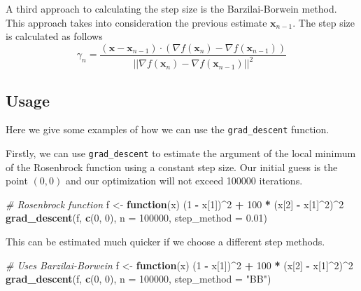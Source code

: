 \documentclass[12pt,]{article}
\newenvironment{Shaded}{\begin{snugshade}}{\end{snugshade}}
\newcommand{\CommentTok}[1]{\textcolor[rgb]{0.56,0.35,0.01}{\textit{#1}}}
\newcommand{\ControlFlowTok}[1]{\textcolor[rgb]{0.13,0.29,0.53}{\textbf{#1}}}
\newcommand{\DataTypeTok}[1]{\textcolor[rgb]{0.13,0.29,0.53}{#1}}
\newcommand{\DecValTok}[1]{\textcolor[rgb]{0.00,0.00,0.81}{#1}}
\newcommand{\FloatTok}[1]{\textcolor[rgb]{0.00,0.00,0.81}{#1}}
\newcommand{\KeywordTok}[1]{\textcolor[rgb]{0.13,0.29,0.53}{\textbf{#1}}}
\newcommand{\NormalTok}[1]{#1}
\newcommand{\OperatorTok}[1]{\textcolor[rgb]{0.81,0.36,0.00}{\textbf{#1}}}
\newcommand{\StringTok}[1]{\textcolor[rgb]{0.31,0.60,0.02}{#1}}
\begin{document}
A third approach to calculating the step size is the Barzilai-Borwein
method. This approach takes into consideration the previous estimate
\(\mathbf{x}_{n-1}\). The step size is calculated as follows \[
    \gamma_n = \frac{(\mathbf{x} - \mathbf{x}_{n-1}) \cdot (\nabla f(\mathbf{x}_n) - \nabla f(\mathbf{x}_{n-1}))}{||\nabla f(\mathbf{x}_n) - \nabla f(\mathbf{x}_{n-1})||^2}
\]

\hypertarget{usage}{%
\subsection{Usage}\label{usage}}

Here we give some examples of how we can use the \texttt{grad\_descent}
function.

Firstly, we can use \texttt{grad\_descent} to estimate the argument of
the local minimum of the Rosenbrock function using a constant step size.
Our initial guess is the point \((0,0)\) and our optimization will not
exceed 100000 iterations.

\begin{Shaded}
\begin{Highlighting}[]
    \CommentTok{# Rosenbrock function}
\NormalTok{    f <-}\StringTok{ }\ControlFlowTok{function}\NormalTok{(x) (}\DecValTok{1} \OperatorTok{-}\StringTok{ }\NormalTok{x[}\DecValTok{1}\NormalTok{])}\OperatorTok{^}\DecValTok{2} \OperatorTok{+}\StringTok{ }\DecValTok{100} \OperatorTok{*}\StringTok{ }\NormalTok{(x[}\DecValTok{2}\NormalTok{] }\OperatorTok{-}\StringTok{ }\NormalTok{x[}\DecValTok{1}\NormalTok{]}\OperatorTok{^}\DecValTok{2}\NormalTok{)}\OperatorTok{^}\DecValTok{2}
    \KeywordTok{grad_descent}\NormalTok{(f, }\KeywordTok{c}\NormalTok{(}\DecValTok{0}\NormalTok{, }\DecValTok{0}\NormalTok{), }\DataTypeTok{n =} \DecValTok{100000}\NormalTok{, }\DataTypeTok{step_method =} \FloatTok{0.01}\NormalTok{)}
\end{Highlighting}
\end{Shaded}

This can be estimated much quicker if we choose a different step
methods.

\begin{Shaded}
\begin{Highlighting}[]
    \CommentTok{# Uses Barzilai-Borwein}
\NormalTok{    f <-}\StringTok{ }\ControlFlowTok{function}\NormalTok{(x) (}\DecValTok{1} \OperatorTok{-}\StringTok{ }\NormalTok{x[}\DecValTok{1}\NormalTok{])}\OperatorTok{^}\DecValTok{2} \OperatorTok{+}\StringTok{ }\DecValTok{100} \OperatorTok{*}\StringTok{ }\NormalTok{(x[}\DecValTok{2}\NormalTok{] }\OperatorTok{-}\StringTok{ }\NormalTok{x[}\DecValTok{1}\NormalTok{]}\OperatorTok{^}\DecValTok{2}\NormalTok{)}\OperatorTok{^}\DecValTok{2}
    \KeywordTok{grad_descent}\NormalTok{(f, }\KeywordTok{c}\NormalTok{(}\DecValTok{0}\NormalTok{, }\DecValTok{0}\NormalTok{), }\DataTypeTok{n =} \DecValTok{100000}\NormalTok{, }\DataTypeTok{step_method =} \StringTok{"BB"}\NormalTok{)}
\end{Highlighting}
\end{Shaded}
\end{document}
